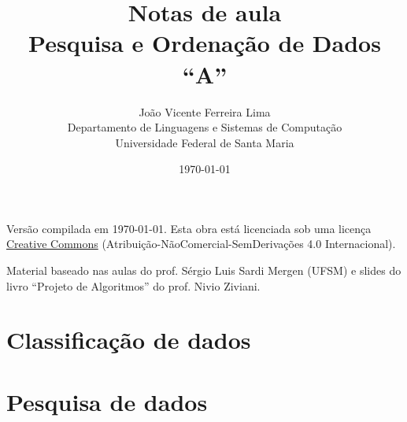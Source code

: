 \documentclass[a4paper,12pt,twoside]{report}
\title{{\bf Notas de aula\\
Pesquisa e Ordenação de Dados ``A''}}
\author{
João Vicente Ferreira Lima\\
Departamento de Linguagens e Sistemas de Computação\\
Universidade Federal de Santa Maria
}
\date{\today}
\begin{document}
\maketitle

Versão compilada em \today.
Esta obra está licenciada sob uma licença \href{http://creativecommons.org/licenses/by-nc-nd/4.0/deed.pt_BR}{Creative Commons} (Atribuição-NãoComercial-SemDerivações 4.0 Internacional).

Material baseado nas aulas do prof. Sérgio Luis Sardi Mergen (UFSM) e slides do
livro ``Projeto de Algoritmos'' do prof. Nivio Ziviani.

\pagestyle{fancy}

\setcounter{tocdepth}{3}
\setcounter{secnumdepth}{3}
\tableofcontents




\part{Classificação de dados}



\part{Pesquisa de dados}


\end{document}
